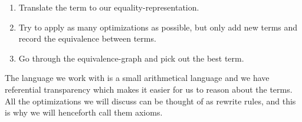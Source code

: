 \begin{enumerate}
  \item Translate the term to our equality-representation.
  \item Try to apply as many optimizations as possible, but only add new terms and
        record the equivalence between terms.
  \item Go through the equivalence-graph and pick out the best term.
\end{enumerate}

The language we work with is a small arithmetical language and we have referential
transparency which makes it easier for us to reason about the terms. All the optimizations
we will discuss can be thought of as rewrite rules, and this is why we will henceforth
call them axioms.



